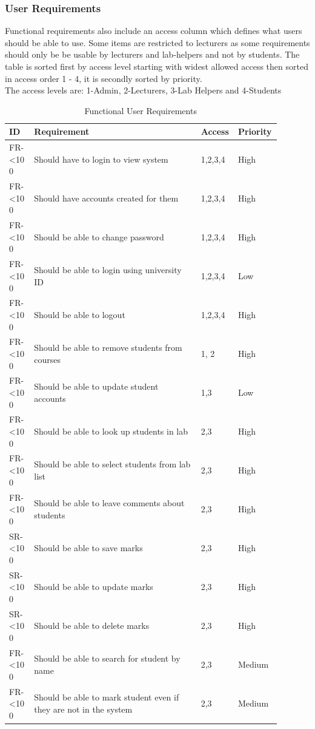 \documentclass[12pt]{article}  %
\newcommand{\rid}[1]{\centering #1-\ifnum\value{requirement}<10 0\fi\arabic{requirement} \stepcounter{requirement}}
\begin{document}
\def\arraystretch{1.5}
\subsubsection{User Requirements}
Functional requirements also include an access column which defines what users should be able to use. Some items are restricted to lecturers as some requirements should only be be usable by lecturers and lab-helpers and not by students. The table is sorted first by access level starting with widest allowed access then sorted in access order 1 - 4, it is secondly sorted by priority.\\
The access levels are: 1-Admin, 2-Lecturers, 3-Lab Helpers and 4-Students




\begin{spacing}{1.5}
\begin{longtable}{|p{0.09\linewidth}|p{0.6\linewidth}|p{0.1\linewidth}|
p{0.1\linewidth}|}
\caption{Functional User Requirements} \label{table:funct-user} \\
\hline


\textbf{ID} & \textbf{Requirement} & \textbf{Access} & \textbf{Priority}\\
\hline \hline


\rid{FR} & Should have to login to view system & 1,2,3,4 & High\\ \hline
\rid{FR} & Should have accounts created for them & 1,2,3,4 & High\\ \hline
\rid{FR} & Should be able to change password & 1,2,3,4 & High\\ \hline
\rid{FR} & Should be able to login using university ID & 1,2,3,4 & Low\\ \hline
\rid{FR} & Should be able to logout & 1,2,3,4 & High \\ \hline

\rid{FR} & Should be able to remove students from courses & 1, 2 & High\\ \hline
\rid{FR} & Should be able to update student accounts & 1,3 & Low \\ \hline

\rid{FR} & Should be able to look up students in lab & 2,3 & High\\ \hline
\rid{FR} & Should be able  to select students from lab list & 2,3 & High\\ \hline
\rid{FR} & Should be able to leave comments about students & 2,3 & High\\ \hline
\rid{SR} & Should be able to save marks & 2,3 & High\\ \hline
\rid{SR} & Should be able to update marks & 2,3 & High\\ \hline
\rid{SR} & Should be able to delete marks & 2,3 & High\\ \hline
\rid{FR} & Should be able to search for student by name & 2,3 & Medium\\ \hline
\rid{FR} & Should be able to mark student even if they are not in the system & 2,3 & Medium \\ \hline


\end{longtable}
\end{spacing}
\end{document}
